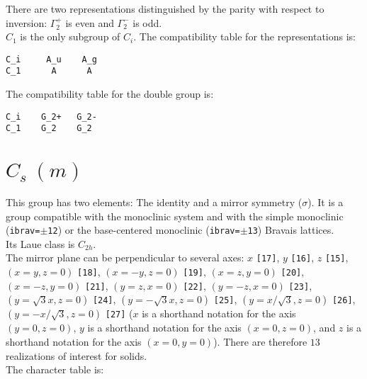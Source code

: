 \documentclass[12pt,a4paper,twoside]{report}
\begin{document}
There are two representations distinguished by the parity
with respect to inversion: $\Gamma_2^+$ is even and $\Gamma_2^-$ is odd.\\
$C_1$ is the only subgroup of $C_i$. The compatibility table for the
representations is:

\begin{tcolorbox}
\begin{footnotesize}
\begin{verbatim}
C_i     A_u    A_g
C_1      A      A
\end{verbatim}
\end{footnotesize}
\end{tcolorbox}

The compatibility table for the double group is:

\begin{tcolorbox}
\begin{footnotesize}
\begin{verbatim}
C_i    G_2+   G_2- 
C_1    G_2    G_2
\end{verbatim}
\end{footnotesize}
\end{tcolorbox}


\newpage
{\color{coral}\section{$C_s\ (m)$}}
\color{black}
This group has two elements: The identity and a mirror symmetry ($\sigma$).
It is a group compatible with the monoclinic system and with the
simple monoclinic (\texttt{ibrav=$\pm$12}) or the base-centered monoclinic 
(\texttt{ibrav=$\pm$13}) Bravais lattices. \\
Its Laue class is $C_{2h}$. \\
The mirror plane can be perpendicular to several axes:  
$x$ \texttt{[17]}, $y$ \texttt{[16]}, $z$ \texttt{[15]}, 
$(x=y, z=0)$ \texttt{[18]}, 
$(x=-y, z=0)$ \texttt{[19]}, 
$(x=z, y=0)$ \texttt{[20]}, $(x=-z, y=0)$ \texttt{[21]},
$(y=z, x=0)$ \texttt{[22]}, $(y=-z, x=0)$ \texttt{[23]}, 
$(y=\sqrt{3}x, z=0)$ \texttt{[24]}, $(y=-\sqrt{3}x, z=0)$ \texttt{[25]}, 
$(y=x/\sqrt{3}, z=0)$ \texttt{[26]}, $(y=-x/\sqrt{3}, z=0)$ 
\texttt{[27]} ($x$ is a shorthand notation for
the axis $(y=0, z=0)$, $y$ is a shorthand notation for
the axis $(x=0, z=0)$, and $z$ is a shorthand notation for
the axis $(x=0, y=0)$). There are therefore $13$ 
realizations of interest for solids. \\
The character table is:
\end{document}
